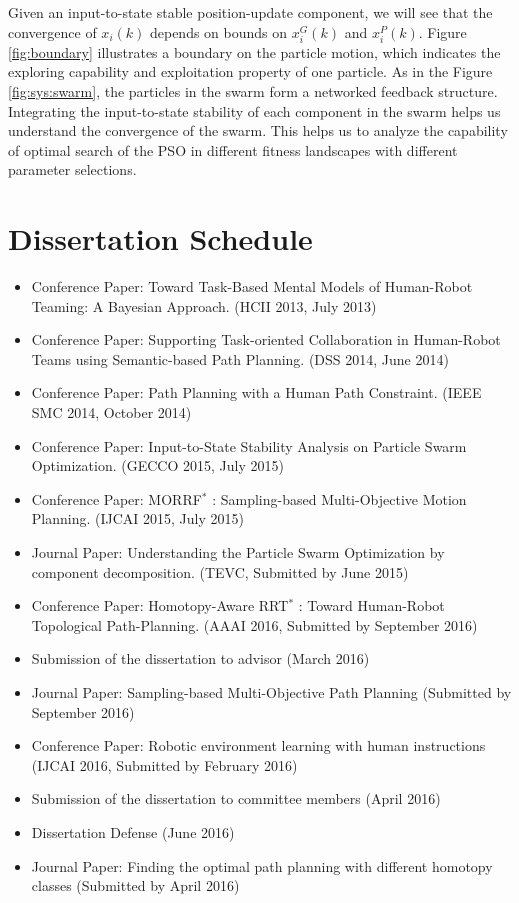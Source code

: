 \documentclass[phd]{byuprop}
\begin{document}
Given an input-to-state stable position-update component, we will see that the convergence of $ x_{i}(k) $ depends on bounds on $ x^{G}_{i}(k) $ and $ x^{P}_{i}(k) $.
Figure \ref{fig:boundary} illustrates a boundary on the particle motion, which indicates the exploring capability and exploitation property of one particle.
As in the Figure \ref{fig:sys:swarm}, the particles in the swarm form a networked feedback structure.
Integrating the input-to-state stability of each component in the swarm helps us understand the convergence of the swarm.
This helps us to analyze the capability of optimal search of the PSO in different fitness landscapes with different parameter selections.


\section{Dissertation Schedule}
\label{sec:dissertation_schedule}

\begin{itemize}
\item Conference Paper: Toward Task-Based Mental Models of Human-Robot Teaming: A Bayesian Approach. (HCII 2013, July 2013)
\item Conference Paper: Supporting Task-oriented Collaboration in Human-Robot Teams using Semantic-based Path Planning. (DSS 2014, June 2014)
\item Conference Paper: Path Planning with a Human
Path Constraint. (IEEE SMC 2014, October 2014)
\item Conference Paper: Input-to-State Stability Analysis on Particle Swarm Optimization. (GECCO 2015, July 2015)
\item Conference Paper: MORRF$^{*}$ : Sampling-based Multi-Objective Motion Planning. (IJCAI 2015, July 2015)
\item Journal Paper: Understanding the Particle Swarm Optimization by component decomposition. (TEVC, Submitted by June 2015)
\item Conference Paper: Homotopy-Aware RRT$^{*}$ : Toward Human-Robot Topological Path-Planning. (AAAI 2016, Submitted by September 2016)
\item Submission of the dissertation to advisor (March 2016)
\item Journal Paper: Sampling-based Multi-Objective Path Planning (Submitted by September 2016)
\item Conference Paper: Robotic environment learning with human instructions (IJCAI 2016, Submitted by February 2016)
\item Submission of the dissertation to committee members (April 2016)
\item Dissertation Defense (June 2016)
\item Journal Paper: Finding the optimal path planning with different homotopy classes (Submitted by April 2016)
\end{itemize}



\end{document}
